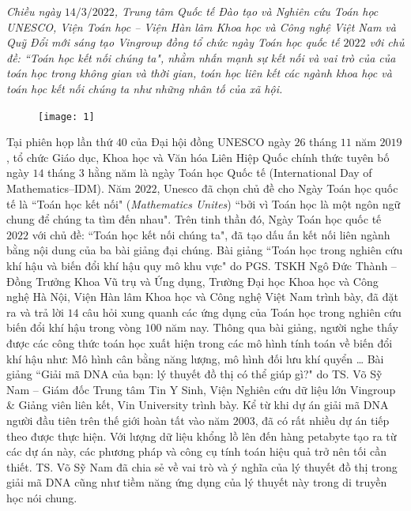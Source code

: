 \vspace*{190pt}


\begin{multicols}{2}	
	\textit{Chiều ngày $14/3/2022$, Trung tâm Quốc tế Đào tạo và Nghiên cứu Toán học UNESCO, Viện Toán học -- Viện Hàn lâm Khoa học và Công nghệ Việt Nam và Quỹ Đổi mới sáng tạo Vingroup đồng tổ chức ngày Toán học quốc tế $2022$ với chủ đề: ``Toán học kết nối chúng ta", nhằm nhấn mạnh sự kết nối và vai trò của của toán học trong không gian và thời gian, toán học liên kết các ngành khoa học và toán học kết nối chúng ta như những nhân tố của xã hội.}
	\begin{figure}[H]
		\centering
		\vspace*{-5pt}
		\captionsetup{labelformat= empty, justification=centering}
		\texttt{[image: 1]}
		\vspace*{-10pt}
	\end{figure}
	Tại phiên họp lần thứ $40$ của Đại hội đồng UNESCO ngày $26$ tháng $11$ năm $2019$, tổ chức Giáo dục, Khoa học và Văn hóa Liên Hiệp Quốc chính thức tuyên bố ngày $14$ tháng $3$ hằng năm là ngày Toán học Quốc tế (International Day of Mathematics--IDM). Năm $2022$, Unesco đã chọn chủ đề cho Ngày Toán học quốc tế là ``Toán học kết nối" (\textit{Mathematics Unites}) ``bởi vì Toán học là một ngôn ngữ chung để chúng ta tìm đến nhau".
	\vskip 0.1cm
	Trên tinh thần đó, Ngày Toán học quốc tế $2022$ với chủ đề: ``Toán học kết nối chúng ta", đã tạo dấu ấn kết nối liên ngành bằng nội dung của ba bài giảng đại chúng.
	\vskip 0.1cm
	Bài giảng ``Toán học trong nghiên cứu khí hậu và biến đổi khí hậu quy mô khu vực" do PGS. TSKH Ngô Đức Thành -- Đồng Trưởng Khoa Vũ trụ và Ứng dụng, Trường Đại học Khoa học và Công nghệ Hà Nội, Viện Hàn lâm Khoa học và Công nghệ Việt Nam trình bày, đã đặt ra và trả lời $14$ câu hỏi xung quanh các ứng dụng của Toán học trong nghiên cứu biến đổi khí hậu trong vòng $100$ năm nay. Thông qua bài giảng, người nghe thấy được các công thức toán học xuất hiện trong các mô hình tính toán về biến đổi khí hậu như: Mô hình cân bằng năng lượng, mô hình đối lưu khí quyển \ldots 
	\vskip 0.1cm
	Bài giảng ``Giải mã DNA của bạn: lý thuyết đồ thị có thể giúp gì?" do TS. Võ Sỹ Nam -- Giám đốc Trung tâm Tin Y Sinh, Viện Nghiên cứu dữ liệu lớn Vingroup \& Giảng viên liên kết, Vin University trình bày. Kể từ khi dự án giải mã DNA người đầu tiên trên thế giới hoàn tất vào năm $2003$, đã có rất nhiều dự án tiếp theo được thực hiện. Với lượng dữ liệu khổng lồ lên đến hàng petabyte tạo ra từ các dự án này, các phương pháp và công cụ tính toán hiệu quả trở nên tối cần thiết. TS. Võ Sỹ Nam đã chia sẻ về vai trò và ý nghĩa của lý thuyết đồ thị trong giải mã DNA cũng như tiềm năng ứng dụng của lý thuyết này trong di truyền học nói chung.

\end{multicols}
